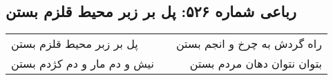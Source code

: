 \begin{center}
\section*{رباعی شماره ۵۲۶: پل بر زبر محیط قلزم بستن}
\label{sec:sh526}
\begin{longtable}{l p{0.5cm} r}
پل بر زبر محیط قلزم بستن
&&
راه گردش به چرخ و انجم بستن
\\
نیش و دم مار و دم کژدم بستن
&&
بتوان نتوان دهان مردم بستن
\\
\end{longtable}
\end{center}
